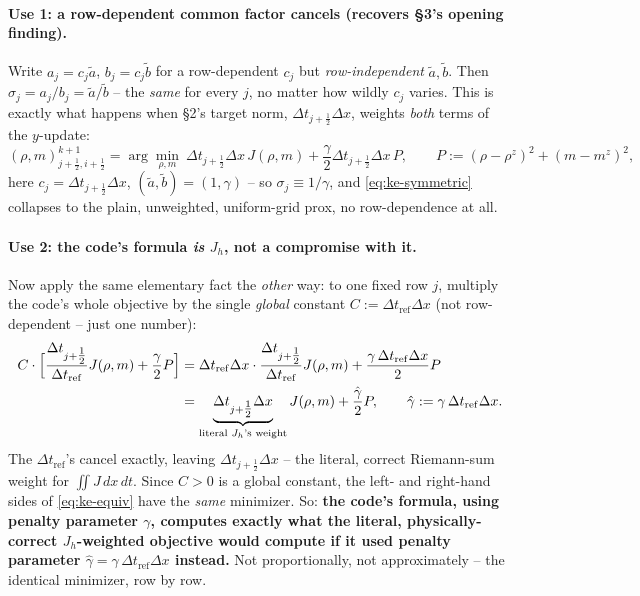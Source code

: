 \documentclass[11pt]{article}
\newcommand{\dt}{\Delta t}
\newcommand{\dx}{\Delta x}
\newcommand{\half}{\tfrac12}
\begin{document}
\paragraph{Use 1: a row-dependent common factor cancels (recovers \S3's opening finding).} Write
$a_j=c_j\tilde a$, $b_j=c_j\tilde b$ for a row-dependent $c_j$ but \emph{row-independent}
$\tilde a,\tilde b$. Then $\sigma_j=a_j/b_j=\tilde a/\tilde b$ -- the \emph{same} for every $j$, no
matter how wildly $c_j$ varies. This is exactly what happens when \S2's target norm,
$\dt_{j+\half}\dx$, weights \emph{both} terms of the $y$-update:
\begin{equation}
  \label{eq:ke-symmetric}
  (\rho,m)^{k+1}_{j+\half,i+\half} = \arg\min_{\rho,m}\ \dt_{j+\half}\dx\,J(\rho,m)
  + \frac{\gamma}{2}\dt_{j+\half}\dx\,P, \qquad P:=(\rho-\rho^z)^2+(m-m^z)^2,
\end{equation}
here $c_j=\dt_{j+\half}\dx$, $(\tilde a,\tilde b)=(1,\gamma)$ -- so $\sigma_j\equiv1/\gamma$, and
\eqref{eq:ke-symmetric} collapses to the plain, unweighted, uniform-grid prox, no row-dependence
at all.

\paragraph{Use 2: the code's formula \emph{is} $J_h$, not a compromise with it.} Now apply the same
elementary fact the \emph{other} way: to one fixed row $j$, multiply the code's whole objective by
the single \emph{global} constant $C:=\dt_\mathrm{ref}\dx$ (not row-dependent -- just one number):
\begin{align}
  C\cdot\Bigl[\frac{\dt_{j+\half}}{\dt_\mathrm{ref}}J(\rho,m)+\frac{\gamma}{2}P\Bigr]
  &= \dt_\mathrm{ref}\dx\cdot\frac{\dt_{j+\half}}{\dt_\mathrm{ref}}J(\rho,m)
  + \frac{\gamma\,\dt_\mathrm{ref}\dx}{2}P \notag\\
  &= \underbrace{\dt_{j+\half}\dx}_{\text{literal } J_h\text{'s weight}}J(\rho,m)
  + \frac{\hat\gamma}{2}P, \qquad \hat\gamma:=\gamma\,\dt_\mathrm{ref}\dx.
  \label{eq:ke-equiv}
\end{align}
The $\dt_\mathrm{ref}$'s cancel exactly, leaving $\dt_{j+\half}\dx$ -- the literal, correct
Riemann-sum weight for $\iint J\,dx\,dt$. Since $C>0$ is a global constant, the left- and
right-hand sides of \eqref{eq:ke-equiv} have the \emph{same} minimizer. So: \textbf{the code's
formula, using penalty parameter $\gamma$, computes exactly what the literal, physically-correct
$J_h$-weighted objective would compute if it used penalty parameter $\hat\gamma=\gamma\,\dt_\mathrm{ref}\dx$
instead.} Not proportionally, not approximately -- the identical minimizer, row by row.
\end{document}
